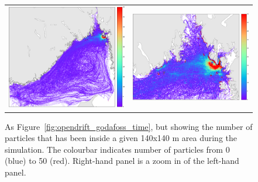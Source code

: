 \begin{figure}[htb]
  \begin{center}
    \begin{tabular}{cc}
      \includegraphics*[width=7.2cm]{Figurer/opendrift/opendrift_godafoss_consentration_crop}  & \includegraphics*[width=7.2cm]{Figurer/opendrift/opendrift_godafoss_consentration_zoom_crop}\\ 
    \end{tabular}
    \caption{\small As Figure~\ref{fig:opendrift_godafoss_time}, but showing the number of particles that has been inside a given 140x140 m area during the simulation. The colourbar indicates number of particles from 0 (blue) to 50 (red). Right-hand panel is a zoom in of the left-hand panel.}
    \label{fig:opendrift_godafoss_conc}
  \end{center}
\end{figure}

